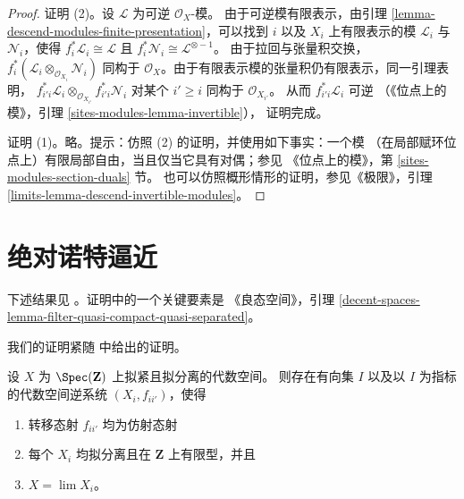 \begin{proof}
证明 (2)。设 $\mathcal{L}$ 为可逆 $\mathcal{O}_X$-模。
由于可逆模有限表示，由引理
\ref{lemma-descend-modules-finite-presentation}，可以找到 $i$ 以及
$X_i$ 上有限表示的模 $\mathcal{L}_i$ 与 $\mathcal{N}_i$，使得
$f_i^*\mathcal{L}_i \cong \mathcal{L}$ 且
$f_i^*\mathcal{N}_i \cong \mathcal{L}^{\otimes -1}$。
由于拉回与张量积交换，
$f_i^*(\mathcal{L}_i \otimes_{\mathcal{O}_{X_i}} \mathcal{N}_i)$
同构于 $\mathcal{O}_X$。由于有限表示模的张量积仍有限表示，同一引理表明，
$f_{i'i}^*\mathcal{L}_i
\otimes_{\mathcal{O}_{X_{i'}}} f_{i'i}^*\mathcal{N}_i$
对某个 $i' \geq i$ 同构于 $\mathcal{O}_{X_{i'}}$。
从而 $f_{i'i}^*\mathcal{L}_i$ 可逆
（《位点上的模》，引理 \ref{sites-modules-lemma-invertible}），
证明完成。

\medskip\noindent
证明 (1)。略。提示：仿照 (2) 的证明，并使用如下事实：一个模
（在局部赋环位点上）有限局部自由，当且仅当它具有对偶；参见
《位点上的模》，第 \ref{sites-modules-section-duals} 节。
也可以仿照概形情形的证明，参见《极限》，引理
\ref{limits-lemma-descend-invertible-modules}。
\end{proof}














\section{绝对诺特逼近}
\label{section-approximation}

\noindent
下述结果见 \cite[Theorem 1.2.2]{CLO}。证明中的一个关键要素是
《良态空间》，引理
\ref{decent-spaces-lemma-filter-quasi-compact-quasi-separated}。

\begin{proposition}
\label{proposition-approximate}
\begin{reference}
我们的证明紧随 \cite[Theorem 1.2.2]{CLO} 中给出的证明。
\end{reference}
设 $X$ 为 $\Spec(\mathbf{Z})$ 上拟紧且拟分离的代数空间。
则存在有向集 $I$ 以及以 $I$ 为指标的代数空间逆系统
$(X_i, f_{ii'})$，使得
\begin{enumerate}
\item 转移态射 $f_{ii'}$ 均为仿射态射
\item 每个 $X_i$ 均拟分离且在 $\mathbf{Z}$ 上有限型，并且
\item $X = \lim X_i$。
\end{enumerate}
\end{proposition}

